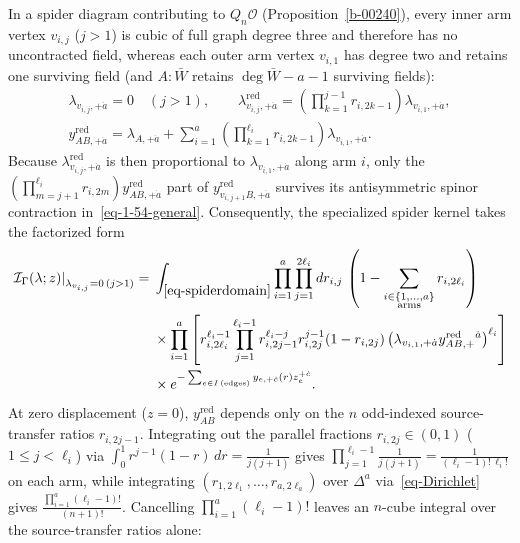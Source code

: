 \documentclass[11pt]{article}
\numberwithin{equation}{section}
\numberwithin{figure}{section}
\numberwithin{table}{section}
\begin{document}
In a spider diagram contributing to $Q_n\mathcal O$ (Proposition~\ref{b-00240}), every inner arm vertex $v_{i,j}$ ($j>1$) is cubic of full graph degree three and therefore has no uncontracted field, whereas each outer arm vertex $v_{i,1}$ has degree two and retains one surviving field (and $A:\bar W$ retains $\deg\bar W-a-1$ surviving fields):
\begin{equation}\label{eq-spider-qn-sources}
\begin{gathered}
\lambda_{v_{i,j},+\dot a}=0\quad(j>1),\qquad
\lambda_{v_{i,j},+\dot a}^{\mathrm{red}}
=\left(\prod_{k=1}^{j-1}r_{i,2k-1}\right)\lambda_{v_{i,1},+\dot a},\\
y_{AB,+\dot a}^{\mathrm{red}}
=\lambda_{A,+\dot a}+\sum_{i=1}^a\left(\prod_{k=1}^{\ell_i}r_{i,2k-1}\right)\lambda_{v_{i,1},+\dot a}.
\end{gathered}
\end{equation}
Because $\lambda_{v_{i,j},+\dot a}^{\mathrm{red}}$ is then proportional to $\lambda_{v_{i,1},+\dot a}$ along arm $i$, only the $(\prod_{m=j+1}^{\ell_i}r_{i,2m})y_{AB,+\dot a}^{\mathrm{red}}$ part of $y_{v_{i,j+1}B,+\dot a}^{\mathrm{red}}$ survives its antisymmetric spinor contraction in~\eqref{eq-1-54-general}. Consequently, the specialized spider kernel takes the factorized form
\begin{equation}
\begin{aligned}
\left.\mathcal I_\Gamma(\lambda;z)\right|_{\lambda_{v_{i,j}}=0\,(j>1)}
={}&\int_{\eqref{eq-spiderdomain}}
\prod_{i=1}^a\prod_{j=1}^{2\ell_i}dr_{i,j}\,
\left(1-\sum_{\substack{i\in\{1,\ldots,a\}\\\mathrm{arms}}}
r_{i,2\ell_i}\right)\\
&\times\prod_{i=1}^a\left[
r_{i,2\ell_i}^{\ell_i-1}
\prod_{j=1}^{\ell_i-1}
r_{i,2j-1}^{\ell_i-j}r_{i,2j}^{j-1}(1-r_{i,2j})
\left(\lambda_{v_{i,1},+\dot a}
y_{AB,+}^{\mathrm{red}}{}^{\dot a}\right)^{\ell_i}
\right]\\
&\times e^{-\sum_{e\in I\,\mathrm{(edges)}}y_{e,+\dot c}(r)z_e^{+\dot c}}.
\end{aligned}
\label{eq-1-54}
\end{equation}
At zero displacement ($z=0$), $y_{AB}^{\mathrm{red}}$ depends only on the $n$ odd-indexed source-transfer ratios $r_{i,2j-1}$. Integrating out the parallel fractions $r_{i,2j}\in(0,1)$ ($1\le j<\ell_i$) via $\int_0^1 r^{j-1}(1-r)\,dr=\frac{1}{j(j+1)}$ gives $\prod_{j=1}^{\ell_i-1}\frac{1}{j(j+1)}=\frac{1}{(\ell_i-1)!\,\ell_i!}$ on each arm, while integrating $(r_{1,2\ell_1},\ldots,r_{a,2\ell_a})$ over $\Delta^a$ via~\eqref{eq-Dirichlet} gives $\frac{\prod_{i=1}^a(\ell_i-1)!}{(n+1)!}$. Cancelling $\prod_{i=1}^a(\ell_i-1)!$ leaves an $n$-cube integral over the source-transfer ratios alone:
\end{document}
